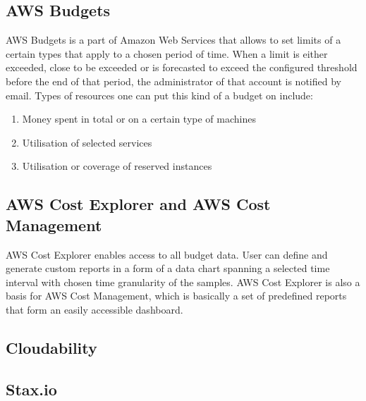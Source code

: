 \documentclass[licencjacka,en]{thesisclass}
\begin{document}
        \subsection{AWS Budgets}

        AWS Budgets is a part of Amazon Web Services that allows to set limits of a certain types
        that apply to a chosen period of time. When a limit is either exceeded,
        close to be exceeded or is forecasted to exceed the configured threshold before the end of that period,
        the administrator of that account is notified by email. Types of resources one can put this kind of a budget on include:
        
        \begin{enumerate}
            \item Money spent in total or on a certain type of machines
            \item Utilisation of selected services
            \item Utilisation or coverage of reserved instances
        \end{enumerate}
	\begin{flushright}
		\cite{AWSDocs}
	\end{flushright}

        \subsection{AWS Cost Explorer and AWS Cost Management}

	AWS Cost Explorer enables access to all budget data. User can define and generate custom reports in a form of a data chart spanning a selected time interval with chosen time granularity of the samples.
	AWS Cost Explorer is also a basis for AWS Cost Management, which is basically a set of predefined reports that form an easily accessible dashboard.

	\subsection{Cloudability}

	\subsection{Stax.io}
\end{document}
